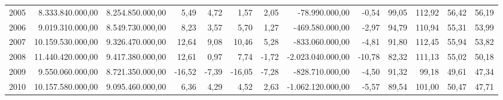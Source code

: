 \documentclass[a4paper,openright,12pt]{book}
\begin{document}
\begin{table}
{\begin{tabular}{lrrrrrrrrrrrr}
    2005 &                      8.333.840.000,00 &                      8.254.850.000,00 &                                          5,49 &                                          4,72 &                                       1,57 &                                       2,05 &         -78.990.000,00 &                    -0,54 &                  99,05 &                112,92 &                                 56,42 &                   56,19 \\
    2006 &                      9.019.310.000,00 &                      8.549.730.000,00 &                                          8,23 &                                          3,57 &                                       5,70 &                                       1,27 &        -469.580.000,00 &                    -2,97 &                  94,79 &                110,94 &                                 55,31 &                   53,99 \\
    2007 &                     10.159.530.000,00 &                      9.326.470.000,00 &                                         12,64 &                                          9,08 &                                      10,46 &                                       5,28 &        -833.060.000,00 &                    -4,81 &                  91,80 &                112,45 &                                 55,94 &                   53,82 \\
    2008 &                     11.440.420.000,00 &                      9.417.380.000,00 &                                         12,61 &                                          0,97 &                                       7,74 &                                      -1,72 &      -2.023.040.000,00 &                   -10,78 &                  82,32 &                111,13 &                                 55,02 &                   50,18 \\
    2009 &                      9.550.060.000,00 &                      8.721.350.000,00 &                                        -16,52 &                                         -7,39 &                                     -16,05 &                                      -7,28 &        -828.710.000,00 &                    -4,50 &                  91,32 &                 99,18 &                                 49,61 &                   47,34 \\
    2010 &                     10.157.580.000,00 &                      9.095.460.000,00 &                                          6,36 &                                          4,29 &                                       4,52 &                                       2,63 &      -1.062.120.000,00 &                    -5,57 &                  89,54 &                101,00 &                                 50,47 &                   47,71 \\

\end{tabular}}
\end{table}
\end{document}
